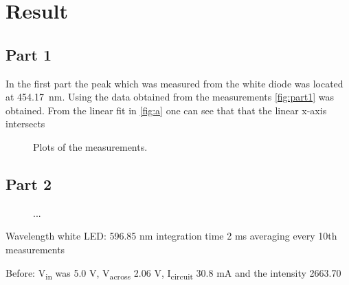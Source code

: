 \section{Result}
\subsection{Part 1}
In the first part the peak which was measured from the white diode was located at \SI{454.17}{\nano\m}. Using the data obtained from the measurements \autoref{fig:part1} was obtained. From the linear fit in \autoref{fig:a} one can see that that the linear x-axis intersects 

\begin{figure}[H]
    \centering
    \hfill
    
    \vspace{0.5cm}
    

    \caption{Plots of the measurements.}
    \label{fig:part1}
\end{figure}




\subsection{Part 2}

\begin{figure}[H]
    \centering
    \hfill
    \caption{...}
    \label{fig:part2}
\end{figure}

Wavelength white LED: 596.85 nm 
integration time 2 ms 
averaging every 10th measurements

Before: V\textsubscript{in} was 5.0 V, V\textsubscript{across} 2.06 V, I\textsubscript{circuit} 30.8 mA and the intensity 2663.70

